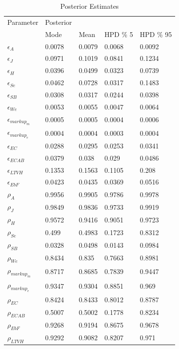 \documentclass[12pt]{article}
\numberwithin{equation}{section}
\begin{document}
\begin{table}[H]
\caption{Posterior Estimates}
\label{post_dist}
\begin{tabular}{l||llll}
Parameter & Posterior &  &  &  \\
 & Mode & Mean & HPD \% 5 & HPD \% 95 \\
 \hline
 \hline
$\epsilon_{A}$ & 0.0078 & 0.0079 & 0.0068 & 0.0092 \\
$\epsilon_{J}$ & 0.0971 & 0.1019 & 0.0841 & 0.1234 \\
$\epsilon_{H}$ & 0.0396 & 0.0499 & 0.0323 & 0.0739 \\
$\epsilon_{Se}$ & 0.0462 & 0.0728 & 0.0317 & 0.1483 \\
$\epsilon_{SB}$ & 0.0308 & 0.0317 & 0.0244 & 0.0398 \\
$\epsilon_{We}$ & 0.0053 & 0.0055 & 0.0047 & 0.0064 \\
$\epsilon_{markup_m}$ & 0.0005 & 0.0005 & 0.0004 & 0.0006 \\
$\epsilon_{markup_e}$ & 0.0004 & 0.0004 & 0.0003 & 0.0004 \\
$\epsilon_{EC}$ & 0.0288 & 0.0295 & 0.0253 & 0.0341 \\
$\epsilon_{ECAB}$ & 0.0379 & 0.038 & 0.029 & 0.0486 \\
$\epsilon_{LTVH}$ & 0.1353 & 0.1563 & 0.1105 & 0.208 \\
$\epsilon_{EbF}$ & 0.0423 & 0.0435 & 0.0369 & 0.0516 \\
\hline
$\rho_{A}$ & 0.9956 & 0.9905 & 0.9786 & 0.9978 \\
$\rho_{J}$ & 0.9849 & 0.9836 & 0.9733 & 0.9919 \\
$\rho_{H}$ & 0.9572 & 0.9416 & 0.9051 & 0.9723 \\
$\rho_{Se}$ & 0.499 & 0.4983 & 0.1723 & 0.8312 \\
$\rho_{SB}$ & 0.0328 & 0.0498 & 0.0143 & 0.0984 \\
$\rho_{We}$ & 0.8434 & 0.835 & 0.7663 & 0.8981 \\
$\rho_{markup_m}$ & 0.8717 & 0.8685 & 0.7839 & 0.9447 \\
$\rho_{markup_e}$ & 0.9347 & 0.9304 & 0.8851 & 0.969 \\
$\rho_{EC}$ & 0.8424 & 0.8433 & 0.8012 & 0.8787 \\
$\rho_{ECAB}$ & 0.5007 & 0.5002 & 0.1778 & 0.8234 \\
$\rho_{EbF}$ & 0.9268 & 0.9194 & 0.8675 & 0.9678 \\
$\rho_{LTVH}$ & 0.9292 & 0.9082 & 0.8207 & 0.971 \\

\end{tabular}
\end{table}
\end{document}
